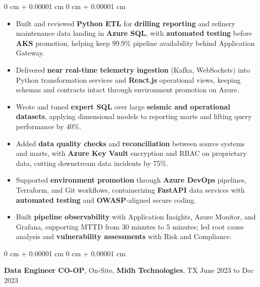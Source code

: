 \documentclass[10pt, letterpaper]{article}
\newenvironment{highlights}{
    \begin{itemize}[
        topsep=0.04 cm,
        parsep=0.04 cm,
        partopsep=0pt,
        itemsep=0pt,
        leftmargin=0 cm + 10pt
    ]
}{
    \end{itemize}
} %
\newenvironment{onecolentry}{
    \begin{adjustwidth}{
        0 cm + 0.00001 cm
    }{
        0 cm + 0.00001 cm
    }
}{
    \end{adjustwidth}
} %
\newcommand{\resumeheading}[2]{%
    \begin{onecolentry}
        #1 \hfill #2
    \end{onecolentry}
} %
\begin{document}
\begin{onecolentry}
\begin{highlights}
	\item Built and reviewed \textbf{Python ETL} for \textbf{drilling reporting} and refinery maintenance data landing in \textbf{Azure SQL}, with \textbf{automated testing} before \textbf{AKS} promotion, helping keep 99.9\% pipeline availability behind Application Gateway.
	\item Delivered \textbf{near real-time telemetry ingestion} (Kafka, WebSockets) into Python transformation services and \textbf{React.js} operational views, keeping schemas and contracts intact through environment promotion on Azure.
	\item Wrote and tuned \textbf{expert SQL} over large \textbf{seismic and operational datasets}, applying dimensional models to reporting marts and lifting query performance by 40\%.
	\item Added \textbf{data quality checks} and \textbf{reconciliation} between source systems and marts, with \textbf{Azure Key Vault} encryption and RBAC on proprietary data, cutting downstream data incidents by 75\%.
	\item Supported \textbf{environment promotion} through \textbf{Azure DevOps} pipelines, Terraform, and Git workflows, containerizing \textbf{FastAPI} data services with \textbf{automated testing} and \textbf{OWASP}-aligned secure coding.
	\item Built \textbf{pipeline observability} with Application Insights, Azure Monitor, and Grafana, supporting MTTD from 30 minutes to 5 minutes; led root cause analysis and \textbf{vulnerability assessments} with Risk and Compliance.
\end{highlights}
\end{onecolentry}



\vspace{0.15 cm}
\resumeheading{\textbf{Data Engineer CO-OP}, On-Site, \textbf{Midh Technologies}, TX}{June 2023 to Dec 2023}
\end{document}
